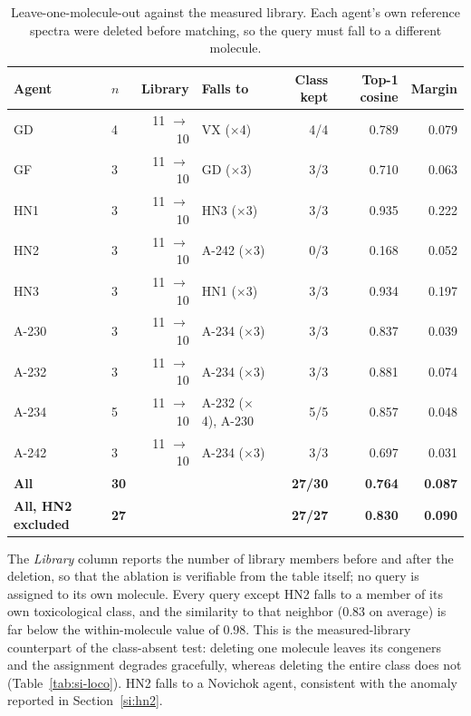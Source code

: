 \documentclass[11pt]{article}
\begin{document}
\begin{table}[htbp]
\centering
\caption{Leave-one-molecule-out against the measured library. Each agent's own reference spectra were deleted before matching, so the query must fall to a different molecule.}
\label{tab:si-loo}
\small
\begin{tabular}{llrp{3.6cm}rrr}
\toprule
Agent & $n$ & Library & Falls to & Class kept & Top-1 cosine & Margin \\
\midrule
GD & 4 & 11 $\rightarrow$ 10 & VX ($\times$4) & 4/4 & 0.789 & 0.079 \\
GF & 3 & 11 $\rightarrow$ 10 & GD ($\times$3) & 3/3 & 0.710 & 0.063 \\
HN1 & 3 & 11 $\rightarrow$ 10 & HN3 ($\times$3) & 3/3 & 0.935 & 0.222 \\
HN2 & 3 & 11 $\rightarrow$ 10 & A-242 ($\times$3) & 0/3 & 0.168 & 0.052 \\
HN3 & 3 & 11 $\rightarrow$ 10 & HN1 ($\times$3) & 3/3 & 0.934 & 0.197 \\
A-230 & 3 & 11 $\rightarrow$ 10 & A-234 ($\times$3) & 3/3 & 0.837 & 0.039 \\
A-232 & 3 & 11 $\rightarrow$ 10 & A-234 ($\times$3) & 3/3 & 0.881 & 0.074 \\
A-234 & 5 & 11 $\rightarrow$ 10 & A-232 ($\times$4), A-230 & 5/5 & 0.857 & 0.048 \\
A-242 & 3 & 11 $\rightarrow$ 10 & A-234 ($\times$3) & 3/3 & 0.697 & 0.031 \\
\textbf{All} & \textbf{30} &  &  & \textbf{27/30} & \textbf{0.764} & \textbf{0.087} \\
\textbf{All, HN2 excluded} & \textbf{27} &  &  & \textbf{27/27} & \textbf{0.830} & \textbf{0.090} \\
\bottomrule
\end{tabular}

\begin{flushleft}\footnotesize The \emph{Library} column reports the number of library members before and after the deletion, so that the ablation is verifiable from the table itself; no query is assigned to its own molecule. Every query except HN2 falls to a member of its own toxicological class, and the similarity to that neighbor (0.83 on average) is far below the within-molecule value of 0.98. This is the measured-library counterpart of the class-absent test: deleting one molecule leaves its congeners and the assignment degrades gracefully, whereas deleting the entire class does not (Table~\ref{tab:si-loco}). HN2 falls to a Novichok agent, consistent with the anomaly reported in Section~\ref{si:hn2}.\end{flushleft}
\end{table}
\end{document}
